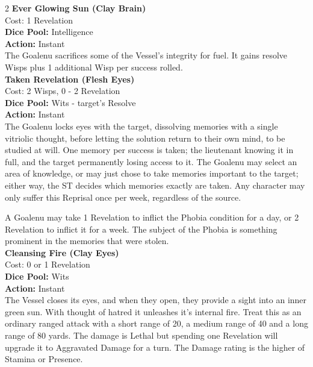 \begin{multicols}{2}
\noindent\textbf{Ever Glowing Sun (Clay Brain)} \\

\noindent Cost: 1 Revelation\\

\noindent\textbf{Dice Pool:} Intelligence\\

\noindent\textbf{Action:} Instant\\

\noindent The Goalenu sacrifices some of the Vessel's integrity for fuel. It gains resolve Wisps plus 1 additional Wisp per success rolled.\\

\noindent\textbf{Taken Revelation (Flesh Eyes)}\\

\noindent Cost: 2 Wisps, 0 - 2 Revelation\\

\noindent\textbf{Dice Pool:} Wits - target's Resolve\\

\noindent\textbf{Action:} Instant\\

\noindent The Goalenu locks eyes with the target, dissolving memories with a single vitriolic thought, before letting the solution return to their own mind, to be studied at will. One memory per success is taken; the lieutenant knowing it in full, and the target permanently losing access to it. The Goalenu may select an area of knowledge, or may just chose to take memories important to the target; either way, the ST decides which memories exactly are taken. Any character may only suffer this Reprisal once per week, regardless of the source.

A Goalenu may take 1 Revelation to inflict the Phobia condition for a day, or 2 Revelation to inflict it for a week. The subject of the Phobia is something prominent in the memories that were stolen.\\

\noindent\textbf{Cleansing Fire (Clay Eyes)}\\

\noindent Cost: 0 or 1 Revelation\\

\noindent\textbf{Dice Pool:} Wits\\

\noindent\textbf{Action:} Instant \\

\noindent The Vessel closes its eyes, and when they open, they provide a sight into an inner green sun. With thought of hatred it unleashes it's internal fire. Treat this as an ordinary ranged attack with a short range of 20, a medium range of 40 and a long range of 80 yards. The damage is Lethal but spending one Revelation will upgrade it to Aggravated Damage for a turn. The Damage rating is the higher of Stamina or Presence. \\


\end{multicols}
